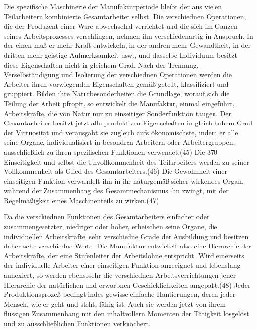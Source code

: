 {Die spezifische Maschinerie der Manufakturperiode bleibt der aus vielen
Teilarbeitern kombinierte Gesamtarbeiter selbst. Die verschiednen
Operationen, die der Produzent einer Ware abwechselnd verrichtet und die
sich im Ganzen seines Arbeitsprozesses verschlingen, nehmen ihn
verschiedenartig in Anspruch. In der einen muß er mehr Kraft entwickeln,
in der andren mehr Gewandtheit, in der dritten mehr geistige
Aufmerksamkeit usw., und dasselbe Individuum besitzt diese Eigenschaften
nicht in gleichem Grad. Nach der Trennung, Verselbständigung und
Isolierung der verschiednen Operationen werden die Arbeiter ihren
vorwiegenden Eigenschaften gemäß geteilt, klassifiziert und gruppiert.
Bilden ihre Naturbesonderheiten die Grundlage, worauf sich die Teilung
der Arbeit pfropft, so entwickelt die Manufaktur, einmal eingeführt,
Arbeitskräfte, die von Natur nur zu einseitiger Sonderfunktion taugen.
Der Gesamtarbeiter besitzt jetzt alle produktiven Eigenschaften in
gleich hohem Grad der Virtuosität und verausgabt sie zugleich aufs
ökonomischste, indem er alle seine Organe, individualisiert in besondren
Arbeitern oder Arbeitergruppen, ausschließlich zu ihren spezifischen
Funktionen verwendet.(45) Die \num{370} Einseitigkeit
und selbst die Unvollkommenheit des Teilarbeiters werden zu seiner
Vollkommenheit als Glied des Gesamtarbeiters.(46) Die Gewohnheit einer
einseitigen Funktion verwandelt ihn in ihr naturgemäß sicher wirkendes
Organ, während der Zusammenhang des Gesamtmechanismus ihn zwingt, mit
der Regelmäßigkeit eines Maschinenteils zu wirken.(47)

Da die verschiednen Funktionen des Gesamtarbeiters einfacher oder
zusammengesetzter, niedriger oder höher, erheischen seine Organe, die
individuellen Arbeitskräfte, sehr verschiedne Grade der Ausbildung und
besitzen daher sehr verschiedne Werte. Die Manufaktur entwickelt also
eine Hierarchie der Arbeitskräfte, der eine Stufenleiter der
Arbeitslöhne entspricht. Wird einerseits der individuelle Arbeiter einer
einseitigen Funktion angeeignet und lebenslang annexiert, so werden
ebensosehr die verschiednen Arbeitsverrichtungen jener Hierarchie der
natürlichen und erworbnen Geschicklichkeiten angepaßt.(48) Jeder
Produktionsprozeß bedingt indes gewisse einfache Hantierungen, deren
jeder Mensch, wie er geht und steht, fähig ist. Auch sie werden jetzt
von ihrem flüssigen Zusammenhang mit den inhaltvollern Momenten der
Tätigkeit losgelöst und zu ausschließlichen Funktionen verknöchert.

}
